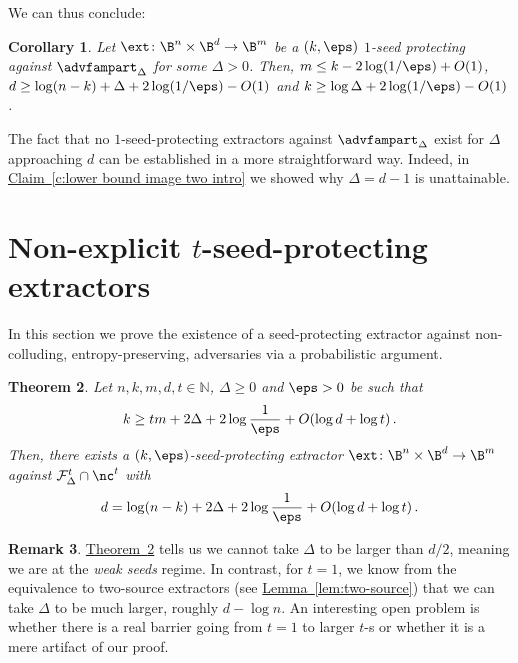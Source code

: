 \documentclass[11pt]{article}
\numberwithin{equation}{section}
\newtheorem{theorem}{Theorem}[section]
\newtheorem{corollary}[theorem]{Corollary}
\theoremstyle{definition}
\newtheorem{remark}[theorem]{Remark}
\theoremstyle{plain}
\newcommand{\expref}[2]{\hyperref[#2]{#1~\ref{#2}}}
\begin{document}
We can thus conclude:
\begin{corollary}
Let $\ext \colon \B^{n} \times \B^{d} \rightarrow \B^{m}$ be a $(k,\eps)$ $1$-seed protecting against $\advfampart_{\Delta}$ for some $\Delta > 0$.
Then, 
$m \le k - 2\log(1/\eps)+O(1)$, $d \ge  \log(n-k)+\Delta+2\log(1/\eps)-O(1)$
and $k \ge \log\Delta+2\log(1/\eps)-O(1)$.
\end{corollary}

The fact that no $1$-seed-protecting extractors against $\advfampart_\Delta$
exist for $\Delta$ approaching $d$ can be established in a more straightforward
way. 
Indeed, in \expref{Claim}{c:lower bound image two intro} we showed why
$\Delta = d-1$ is unattainable.


%
\section{Non-explicit 
\texorpdfstring{$t$-seed-protecting}{t-seed-protecting} extractors}\label{sec:nexp}

In this section we prove the existence of a seed-protecting extractor against non-colluding, entropy-preserving, adversaries via a probabilistic argument.

\begin{theorem}\label{thm:non-explicit}
Let $n,k,m,d,t \in \mathbb{N}$, $\Delta \ge 0$ and $\eps > 0$ be such that
\[
k \ge tm+2\Delta+2\log\frac{1}{\eps}+O(\log d + \log t)\,.
\]
Then, there exists a $(k,\eps)$-seed-protecting extractor $\ext \colon \B^{n} \times \B^{d} \rightarrow \B^{m}$ against
$\mathcal{F}_{\Delta}^{t} \cap \nc^t$ with
\[
d  = \log(n-k) + 2\Delta +2\log\frac{1}{\eps}+O(\log d + \log t)\,.
\]
\end{theorem}

%
\begin{remark}  %
\expref{Theorem}{thm:non-explicit} tells us we cannot take $\Delta$ to be larger than %
%
$d/2$, 
%
meaning
we are at the \emph{weak seeds} regime. In contrast, for $t = 1$, we know from the
equivalence to two-source extractors (see \expref{Lemma}{lem:two-source}) that we can take
$\Delta$ to be much larger, roughly $d-\log n$. An interesting open problem is 
whether there is a real barrier going from $t = 1$ to larger $t$-s or whether it is a mere
artifact of our proof.
\end{remark}   %
\end{document}
